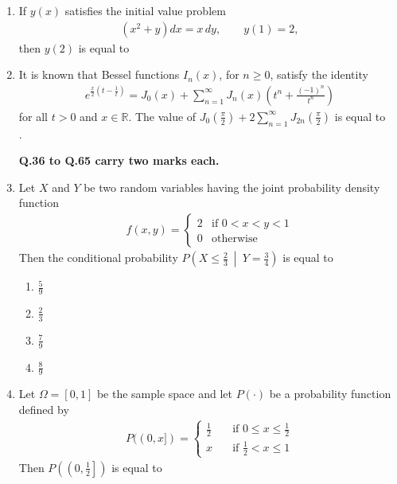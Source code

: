 \documentclass[journal]{IEEEtran}
\numberwithin{equation}{enumi}
\numberwithin{figure}{enumi}
\begin{document}
\begin{enumerate}
\item If $y(x)$ satisfies the initial value problem  \hfill{}
\begin{align*}
(x^2 + y) dx = x\, dy, \qquad y(1) = 2,
\end{align*}
then $y(2)$ is equal to \underline{\hspace{2cm}}
\vspace{1em}

\item It is known that Bessel functions $I_n(x)$, for $n \geq 0$, satisfy the identity
\begin{align*}
e^{\frac{x}{2} (t - \frac{1}{t})} = J_0(x) + \sum_{n=1}^{\infty} J_n(x) \left( t^n + \frac{(-1)^n}{t^n} \right)
\end{align*}
for all $t > 0$ and $x \in \mathbb{R}$. The value of $J_0\left(\frac{\pi}{2}\right) + 2 \sum_{n=1}^{\infty} J_{2n}\left(\frac{\pi}{2}\right)$ is equal to \underline{\hspace{2cm}}\\
 . \hfill{}

 \textbf{Q.36 to Q.65 carry two marks each.}

\item Let $X$ and $Y$ be two random variables having the joint probability density function
\begin{align*}
f(x, y) = 
\begin{cases}
2 & \text{if } 0 < x < y < 1 \\
0 & \text{otherwise}
\end{cases}
\end{align*}
Then the conditional probability $P \left( X \leq \frac{2}{3} \ \middle| \ Y = \frac{3}{4} \right)$ is equal to
 \hfill{}
 \begin{multicols}{4}
\begin{enumerate}
\item  $\frac{5}{9}$ 
\item  $\frac{2}{3}$
\item  $\frac{7}{9}$ 
\item  $\frac{8}{9}$
\end{enumerate}
\end{multicols}

\item Let $\Omega = [0, 1]$ be the sample space and let $P(\cdot)$ be a probability function defined by
\begin{align*}
P((0, x]) = 
\begin{cases}
\frac{1}{2} & \quad \text{if } 0 \leq x \leq \frac{1}{2} \\
x & \quad \text{if } \frac{1}{2} < x \leq 1
\end{cases}
\end{align*}
Then $P\left( \left(0, \frac{1}{2}\right] \right)$ is equal to \underline{\hspace{2cm}}
 \hfill{}
\vspace{1em}



\end{enumerate}
\end{document}
